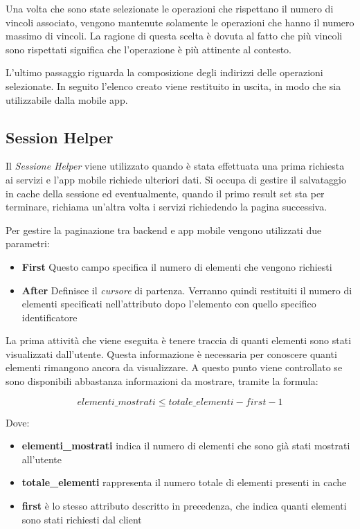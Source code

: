 Una volta che sono state selezionate le operazioni che rispettano il numero di vincoli associato, vengono mantenute solamente le operazioni che hanno il numero massimo di vincoli. La ragione di questa scelta è dovuta al fatto che più vincoli sono rispettati significa che l'operazione è più attinente al contesto.

L'ultimo passaggio riguarda la composizione degli indirizzi delle operazioni selezionate. In seguito l'elenco creato viene restituito in uscita, in modo che sia utilizzabile dalla mobile app.

\subsection{Session Helper\label{sec:session-helper}}

Il \emph{Sessione Helper} viene utilizzato quando è stata effettuata una prima richiesta ai servizi e l'app mobile richiede ulteriori dati. Si occupa di gestire il salvataggio in cache della sessione ed eventualmente, quando il primo result set sta per terminare, richiama un'altra volta i servizi richiedendo la pagina successiva.

Per gestire la paginazione tra backend e app mobile vengono utilizzati due parametri:

\begin{itemize}
	\item \textbf{First} Questo campo specifica il numero di elementi che vengono richiesti
	\item \textbf{After} Definisce il \emph{cursore} di partenza. Verranno quindi restituiti il numero di elementi specificati nell'attributo  dopo l'elemento con quello specifico identificatore
\end{itemize}

La prima attività che viene eseguita è tenere traccia di quanti elementi sono stati visualizzati dall'utente. Questa informazione è necessaria per conoscere quanti elementi rimangono ancora da visualizzare. A questo punto viene controllato se sono disponibili abbastanza informazioni da mostrare, tramite la formula:

\begin{equation}
	elementi\_mostrati \le totale\_elementi - first - 1
\end{equation}

Dove:

\begin{itemize}
	\item \textbf{elementi\_mostrati} indica il numero di elementi che sono già stati mostrati all'utente
	\item \textbf{totale\_elementi} rappresenta il numero totale di elementi presenti in cache
	\item \textbf{first} è lo stesso attributo descritto in precedenza, che indica quanti elementi sono stati richiesti dal client
\end{itemize}

